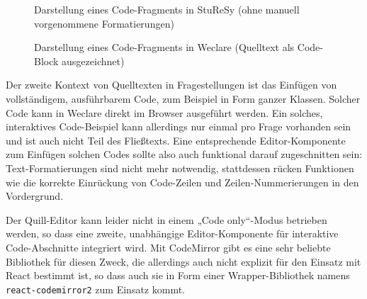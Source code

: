 \begin{figure}[H]
    \centering
    \setlength{\fboxsep}{0pt}
    \setlength{\fboxrule}{0.5pt}
    \caption{Darstellung eines Code-Fragments in StuReSy (ohne manuell vorgenommene  Formatierungen)}
    \label{abb:sturesy_code_fragment}
\end{figure}


\begin{figure}[H]
    \centering
    \setlength{\fboxsep}{0pt}
    \setlength{\fboxrule}{0.5pt}
    \caption{Darstellung eines Code-Fragments in Weclare (Quelltext als Code-Block ausgezeichnet)}
    \label{abb:weclare_code_fragment}
\end{figure}

Der zweite Kontext von Quelltexten in Fragestellungen ist das Einfügen von vollständigem, ausführbarem Code, zum Beispiel in Form ganzer Klassen. Solcher Code kann in Weclare direkt im Browser ausgeführt werden. Ein solches, interaktives Code-Beispiel kann allerdings nur einmal pro Frage vorhanden sein und ist auch nicht Teil des Fließtexts. Eine entsprechende Editor-Komponente zum Einfügen solchen Codes sollte also auch funktional darauf zugeschnitten sein: Text-Formatierungen sind nicht mehr notwendig, stattdessen rücken Funktionen wie die korrekte Einrückung von Code-Zeilen und Zeilen-Nummerierungen in den Vordergrund.

Der Quill-Editor kann leider nicht in einem „Code only“-Modus betrieben werden, so dass eine zweite, unabhängige Editor-Komponente für interaktive Code-Abschnitte integriert wird. Mit CodeMirror\cite{web:codemirror} gibt es eine sehr beliebte Bibliothek für diesen Zweck, die allerdings auch nicht explizit für den Einsatz mit React bestimmt ist, so dass auch sie in Form einer Wrapper-Bibliothek namens \texttt{react-codemirror2}\cite{web:react_codemirror2} zum Einsatz kommt.

